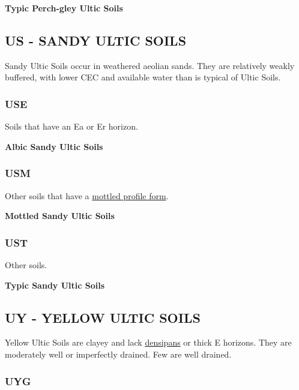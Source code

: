 \documentclass[
  letterpaper,
  DIV=11,
  numbers=noendperiod]{scrreprt}
\begin{document}
\textbf{Typic Perch-gley Ultic Soils}

\hypertarget{sec-US}{%
\subsection{\texorpdfstring{\textbf{US} - SANDY ULTIC
SOILS}{US - SANDY ULTIC SOILS}}\label{sec-US}}

Sandy Ultic Soils occur in weathered aeolian sands. They are relatively
weakly buffered, with lower CEC and available water than is typical of
Ultic Soils.

\hypertarget{sec-key-USE}{%
\subsubsection{\texorpdfstring{\textbf{USE}}{USE}}\label{sec-key-USE}}

Soils that have an Ea or Er horizon.

\textbf{Albic Sandy Ultic Soils}

\hypertarget{sec-key-USM}{%
\subsubsection{\texorpdfstring{\textbf{USM}}{USM}}\label{sec-key-USM}}

Other soils that have a \protect\hyperlink{sec-diag-mottpf}{mottled
profile form}.

\textbf{Mottled Sandy Ultic Soils}

\hypertarget{sec-key-UST}{%
\subsubsection{\texorpdfstring{\textbf{UST}}{UST}}\label{sec-key-UST}}

Other soils.

\textbf{Typic Sandy Ultic Soils}

\hypertarget{sec-UY}{%
\subsection{\texorpdfstring{\textbf{UY} - YELLOW ULTIC
SOILS}{UY - YELLOW ULTIC SOILS}}\label{sec-UY}}

Yellow Ultic Soils are clayey and lack
\protect\hyperlink{sec-diag-dens}{densipans} or thick E horizons. They
are moderately well or imperfectly drained. Few are well drained.

\hypertarget{sec-key-UYG}{%
\subsubsection{\texorpdfstring{\textbf{UYG}}{UYG}}\label{sec-key-UYG}}
\end{document}
